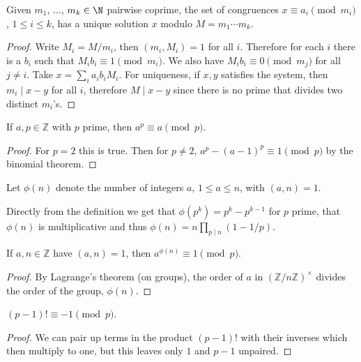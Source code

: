 \documentclass[a4paper, 10pt]{amsart}
\begin{document}
\begin{theorem}
    Given $m_1$, $\dots$, $m_k \in \N$ pairwise coprime, the set of congruences $x \equiv a_i \pmod{m_i}$, $1 \leq i \leq k$, has a unique solution $x$ modulo $M = m_1 \cdots m_k$.
\end{theorem}
\begin{proof}
  Write $M_i=M / m_i$, then $\left(m_i, M_i\right)=1$ for all $i$. Therefore for each $i$ there is a $b_i$ such that $M_i b_i \equiv 1\pmod{m_i}$. We also have $M_i b_i \equiv 0 \pmod{m_j}$ for all $j \neq i$. Take $x=\sum_i a_i b_i M_i$. For uniqueness, if $x, y$ satisfies the system, then $m_i \mid x-y$ for all $i$, therefore $M \mid x-y$ since there is no prime that divides two distinct $m_i$'s.
\end{proof}

\begin{theorem}
  If $a, p \in \mathbb{Z}$ with $p$ prime, then $a^p \equiv a \pmod{p}$.
\end{theorem}
\begin{proof}
  For $p = 2$ this is true. Then for $p \neq 2$, $a^p - (a-1)^p \equiv 1 \pmod{p}$ by the binomial theorem. 
\end{proof}

\begin{definition}
Let $\phi(n)$ denote the number of integers $a$, $1 \leq a \leq n$, with $(a, n) = 1$.
\end{definition}

\begin{remark}
  Directly from the definition we get that $\phi(p^k) = p^k - p^{k-1}$ for $p$ prime, that $\phi(n)$ is multiplicative and thus $\phi(n) = n \prod_{p \mid n} (1 - 1/p)$.
\end{remark}

\begin{theorem}
  If $a, n \in \mathbb{Z}$ have $(a, n) = 1$, then $a^{\phi(n)} \equiv 1 \pmod{p}$.
\end{theorem}
\begin{proof}
By Lagrange's theorem (on groups), the order of $a$ in $(\mathbb{Z}/n\mathbb{Z})^\times$ divides the order of the group, $\phi(n)$.
\end{proof}

\begin{theorem}[Wilson]
$(p - 1)! \equiv -1 \pmod{p}$.
\end{theorem}
\begin{proof}
  We can pair up terms in the product $(p-1)!$ with their inverses which then multiply to one, but this leaves only $1$ and $p - 1$ unpaired.
\end{proof}
\end{document}
